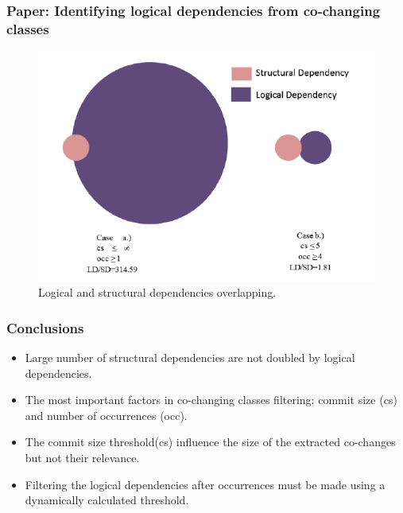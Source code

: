 \documentclass{beamer}
\begin{document}
 \begin{frame}
\frametitle{Paper: Identifying logical dependencies from co-changing classes}

\begin{center}
     \begin{figure}
	\includegraphics[width= 9.4 cm]{ld_overlapp.PNG}
	\caption{\label{fig:fig5} Logical and structural dependencies overlapping. }
     \end{figure}
\end{center}

\end{frame}


 \begin{frame}
\frametitle{Conclusions}
 \begin{itemize}
        \item  Large number of structural dependencies are not doubled by logical dependencies.
        \item  The most important factors in co-changing classes filtering: commit size (cs) and number of occurrences (occ).
        \item The commit size threshold(cs) influence the size of the extracted co-changes but not their relevance.
        \item Filtering the logical dependencies after occurrences must be made using a dynamically calculated threshold. 
    \end{itemize}
\end{frame}
\end{document}
